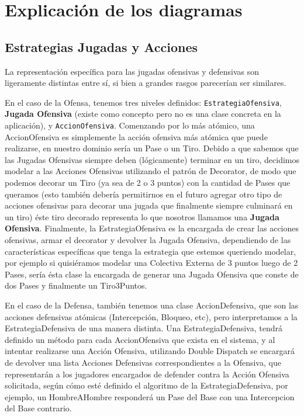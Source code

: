 \section{Explicación de los diagramas}

\subsection{Estrategias Jugadas y Acciones}

La representación específica para las jugadas ofensivas y defensivas son ligeramente distintas entre sí, si bien a grandes rasgos parecerían ser similares.

En el caso de la Ofensa, tenemos tres niveles definidos: \texttt{EstrategiaOfensiva}, \textbf{Jugada Ofensiva} (existe como concepto pero no es una clase concreta en la aplicación), y \texttt{AccionOfensiva}. Comenzando por lo más atómico, una AccionOfensiva es simplemente la acción ofensiva más atómica que puede realizarse, en nuestro dominio sería un Pase o un Tiro. Debido a que sabemos que las Jugadas Ofensivas siempre deben (lógicamente) terminar en un tiro, decidimos modelar a las Acciones Ofensivas utilizando el patrón de Decorator, de modo que podemos decorar un Tiro (ya sea de 2 o 3 puntos) con la cantidad de Pases que queramos (esto también debería permitirnos en el futuro agregar otro tipo de acciones ofensivas para decorar una jugada que finalmente siempre culminará en un tiro) éste tiro decorado representa lo que nosotros llamamos una \textbf{Jugada Ofensiva}. Finalmente, la EstrategiaOfensiva es la encargada de crear las acciones ofensivas, armar el decorator y devolver la Jugada Ofensiva, dependiendo de las características específicas que tenga la estrategia que estemos queriendo modelar, por ejemplo si quisiéramos modelar una Colectiva Externa de 3 puntos luego de 2 Pases, sería ésta clase la encargada de generar una Jugada Ofensiva que conste de dos Pases y finalmente un Tiro3Puntos.

En el caso de la Defensa, también tenemos una clase AccionDefensiva, que son las acciones defensivas atómicas (Intercepción, Bloqueo, etc), pero interpretamos a la EstrategiaDefensiva de una manera distinta. Una EstrategiaDefensiva, tendrá definido un método para cada AccionOfensiva que exista en el sistema, y al intentar realizarse una Acción Ofensiva, utilizando Double Dispatch se encargará de devolver una lista Acciones Defensivas correspondientes a la Ofensiva, que representarán a los jugadores encargados de defender contra la Acción Ofensiva solicitada, según cómo esté definido el algoritmo de la EstrategiaDefensiva, por ejemplo, un HombreAHombre responderá un Pase del Base con una Intercepcion del Base contrario.

